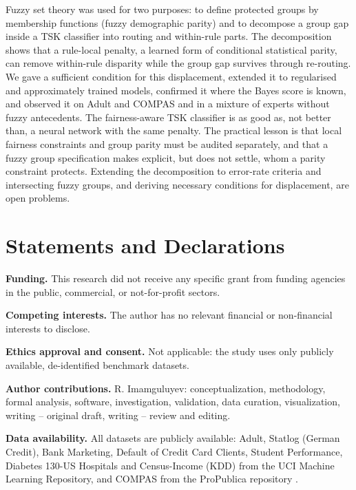 \documentclass[pdflatex,sn-basic,Numbered,lineno]{sn-jnl}
\begin{document}
Fuzzy set theory was used for two purposes: to define protected groups by membership functions (fuzzy demographic parity) and to decompose a group gap inside a TSK classifier into routing and within-rule parts. The decomposition shows that a rule-local penalty, a learned form of conditional statistical parity, can remove within-rule disparity while the group gap survives through re-routing. We gave a sufficient condition for this displacement, extended it to regularised and approximately trained models, confirmed it where the Bayes score is known, and observed it on Adult and COMPAS and in a mixture of experts without fuzzy antecedents. The fairness-aware TSK classifier is as good as, not better than, a neural network with the same penalty. The practical lesson is that local fairness constraints and group parity must be audited separately, and that a fuzzy group specification makes explicit, but does not settle, whom a parity constraint protects. Extending the decomposition to error-rate criteria and intersecting fuzzy groups, and deriving necessary conditions for displacement, are open problems.

\hypertarget{statements-and-declarations}{%
\backmatter
\section*{Statements and Declarations}\label{statements-and-declarations}}

\textbf{Funding.} This research did not receive any specific grant from funding agencies in the public, commercial, or not-for-profit sectors.

\textbf{Competing interests.} The author has no relevant financial or non-financial interests to disclose.

\textbf{Ethics approval and consent.} Not applicable: the study uses only publicly available, de-identified benchmark datasets.

\textbf{Author contributions.} R. Imamguluyev: conceptualization, methodology, formal analysis, software, investigation, validation, data curation, visualization, writing -- original draft, writing -- review and editing.

\textbf{Data availability.} All datasets are publicly available: Adult, Statlog (German Credit), Bank Marketing, Default of Credit Card Clients, Student Performance, Diabetes 130-US Hospitals and Census-Income (KDD) from the UCI Machine Learning Repository, and COMPAS from the ProPublica repository \cite{compas}.
\end{document}
